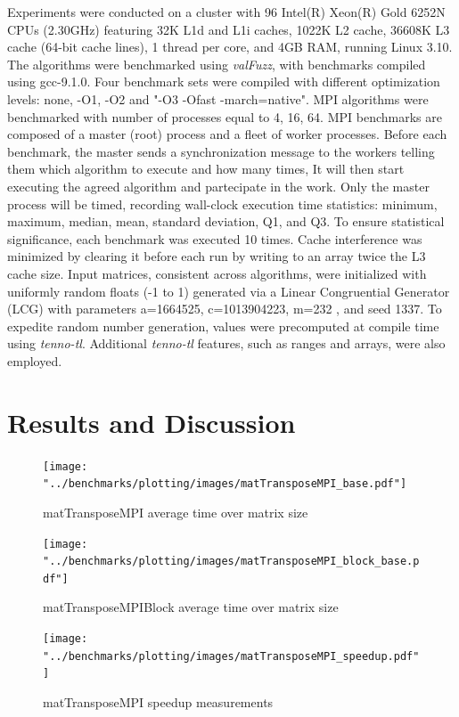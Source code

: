 \documentclass[conference]{IEEEtran}
\begin{document}
Experiments were conducted on a cluster with 96 Intel(R) Xeon(R) Gold
6252N CPUs (2.30GHz) featuring 32K L1d and L1i caches, 1022K L2 cache,
36608K L3 cache (64-bit cache lines), 1 thread per core, and 4GB RAM,
running Linux 3.10. The algorithms were benchmarked using \textit{valFuzz},
with benchmarks compiled using gcc-9.1.0. Four benchmark sets were
compiled with different optimization levels: none, -O1, -O2 and "-O3
-Ofast -march=native".
MPI algorithms were benchmarked with number of processes equal to 4, 16, 64.
MPI benchmarks are composed of a master (root) process and a fleet
of worker processes. Before each benchmark, the master sends
a synchronization message to the workers telling them which algorithm
to execute and how many times, It will then start executing the agreed
algorithm and partecipate in the work. Only the master process will be
timed, recording wall-clock execution time statistics: minimum, maximum,
median, mean, standard deviation, Q1, and Q3. To ensure statistical
significance, each benchmark was executed 10 times. Cache interference was
minimized by clearing it before each run by writing to an array twice
the L3 cache size. Input matrices, consistent across algorithms, were
initialized with uniformly random floats (-1 to 1) generated via a
Linear Congruential Generator (LCG) \cite{b8} with parameters a=1664525,
c=1013904223, m=232 \cite{b9}, and seed 1337.
To expedite random number generation, values were precomputed at
compile time using \textit{tenno-tl}. Additional \textit{tenno-tl}
features, such as ranges and arrays, were also employed.

\section{Results and Discussion}

\begin{figure}[htb]
	\centering
	\texttt{[image: "../benchmarks/plotting/images/matTransposeMPI\_base.pdf"]}
	\caption{matTransposeMPI average time over matrix size}
	\label{fig:transpose_mpi_base}
\end{figure}

\begin{figure}[htb]
	\centering
	\texttt{[image: "../benchmarks/plotting/images/matTransposeMPI\_block\_base.pdf"]}
	\caption{matTransposeMPIBlock average time over matrix size}
	\label{fig:transpose_mpi_block}
\end{figure}

\begin{figure}[htb]
	\centering
	\texttt{[image: "../benchmarks/plotting/images/matTransposeMPI\_speedup.pdf"]}
	\caption{matTransposeMPI speedup measurements}
	\label{fig:transpose_mpi_speedup}
\end{figure}
\end{document}
